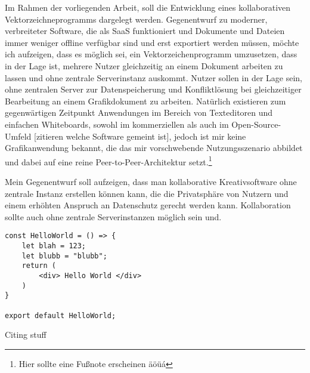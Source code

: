 Im Rahmen der vorliegenden Arbeit, soll die Entwicklung eines kollaborativen Vektorzeichneprogramms
dargelegt werden. 
Gegenentwurf zu moderner, verbreiteter Software, die als SaaS funktioniert und Dokumente und
Dateien immer weniger offline verfügbar sind und erst \glqq{}exportiert\grqq{} werden müssen, möchte ich aufzeigen, dass es möglich sei, ein Vektorzeichenprogramm umzusetzen, dass in der Lage ist, mehrere Nutzer gleichzeitig an einem Dokument arbeiten zu lassen und ohne zentrale Serverinstanz auskommt. 
Nutzer sollen in der Lage sein, ohne zentralen Server zur Datenspeicherung und Konfliktlösung bei gleichzeitiger Bearbeitung an einem Grafikdokument zu arbeiten. 
Natürlich existieren zum gegenwärtigen Zeitpunkt Anwendungen im Bereich von Texteditoren und einfachen Whiteboards, sowohl im kommerziellen als auch im Open-Source-Umfeld [zitieren welche Software gemeint ist], jedoch ist mir keine Grafikanwendung bekannt, die das mir vorschwebende Nutzungsszenario abbildet und dabei auf eine reine Peer-to-Peer-Architektur setzt.\footnote{Hier sollte eine Fußnote erscheinen äöüá}
\par 
Mein Gegenentwurf soll aufzeigen, dass man kollaborative Kreativsoftware ohne zentrale Instanz erstellen
können kann, die die Privatsphäre von Nutzern und einem erhöhten Anspruch an Datenschutz gerecht werden kann. 
Kollaboration sollte auch ohne zentrale Serverinstanzen möglich sein und.

\begin{lstlisting}[caption={Bsp.: Hello World (React)}]
const HelloWorld = () => {
	let blah = 123;
	let blubb = "blubb";
	return (
		<div> Hello World </div>
	)
}

export default HelloWorld;
\end{lstlisting}




Citing stuff \cite{kleppmanLocalfirstSoftwareYou2019}
